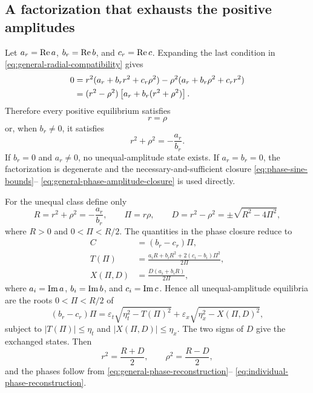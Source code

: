 \subsection{A factorization that exhausts the positive amplitudes}

Let $a_r=\operatorname{Re} a$, $b_r=\operatorname{Re} b$, and $c_r=\operatorname{Re} c$. Expanding the
last condition in \eqref{eq:general-radial-compatibility} gives
\begin{align}
 0={}&r^2(a_r+b_rr^2+c_r\rho^2)
 -\rho^2(a_r+b_r\rho^2+c_rr^2)\notag\\
 ={}&(r^2-\rho^2)\left[a_r+b_r(r^2+\rho^2)\right].
 \label{eq:forced-amplitude-factorization}
\end{align}
Therefore every positive equilibrium satisfies
\begin{equation}
 \boxed{r=\rho}
\end{equation}
or, when $b_r\ne0$, it satisfies
\begin{equation}
 \boxed{r^2+\rho^2=-\frac{a_r}{b_r}}.
 \label{eq:equal-or-unequal}
\end{equation}
If $b_r=0$ and $a_r\ne0$, no unequal-amplitude state exists. If
$a_r=b_r=0$, the factorization is degenerate and the necessary-and-sufficient
closure \eqref{eq:phase-sine-bounds}--
\eqref{eq:general-phase-amplitude-closure} is used directly.

For the unequal class define only
\begin{equation}
 R=r^2+\rho^2=-\frac{a_r}{b_r},\qquad
 \Pi=r\rho,\qquad
 D=r^2-\rho^2=\pm\sqrt{R^2-4\Pi^2},
 \label{eq:unequal-invariants}
\end{equation}
where $R>0$ and $0<\Pi<R/2$. The quantities in the phase closure reduce to
\begin{align}
 C&=(b_r-c_r)\Pi,
 \label{eq:unequal-C}\\
 T(\Pi)&=\frac{a_iR+b_iR^2+2(c_i-b_i)\Pi^2}{2\Pi},
 \label{eq:unequal-T}\\
 X(\Pi,D)&=\frac{D(a_i+b_iR)}{2\Pi},
 \label{eq:unequal-X}
\end{align}
where $a_i=\operatorname{Im} a$, $b_i=\operatorname{Im} b$, and $c_i=\operatorname{Im} c$. Hence all
unequal-amplitude equilibria are the roots $0<\Pi<R/2$ of
\begin{equation}
 (b_r-c_r)\Pi
 =\varepsilon_t\sqrt{\eta_t^2-T(\Pi)^2}
 +\varepsilon_x\sqrt{\eta_x^2-X(\Pi,D)^2},
 \label{eq:unequal-scalar-equation}
\end{equation}
subject to $|T(\Pi)|\leq\eta_t$ and
$|X(\Pi,D)|\leq\eta_x$. The two signs of $D$ give the exchanged states.
Then
\begin{equation}
 r^2=\frac{R+D}{2},\qquad \rho^2=\frac{R-D}{2},
 \label{eq:unequal-reconstruction}
\end{equation}
and the phases follow from
\eqref{eq:general-phase-reconstruction}--
\eqref{eq:individual-phase-reconstruction}.

